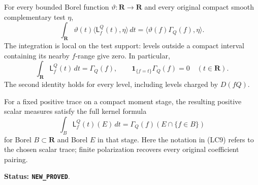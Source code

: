 \begin{theorem}
\label{thm:r11-level-coarea}
For every bounded Borel function $\vartheta:\mathbf R\to\mathbf R$
and every original compact smooth complementary test $\eta$,
\[
 \int_{\mathbf R}\vartheta(t)
                 \langle\mathsf L^Q_f(t),\eta\rangle\,dt
       =\langle\vartheta(f)\Gamma_Q(f),\eta\rangle.
 \tag{LC7}
\]
The integration is local on the test support: levels outside a
compact interval containing its nearby $f$-range give zero.
In particular,
\[
 \int_{\mathbf R}\mathsf L^Q_f(t)\,dt=\Gamma_Q(f),
 \qquad
 \mathbf1_{\{f=t\}}\Gamma_Q(f)=0\quad(t\in\mathbf R).
 \tag{LC8}
\]
The second identity holds for every level, including levels
charged by $D(fQ)$.

For a fixed positive trace on a compact moment stage, the resulting
positive scalar measures satisfy the full kernel formula
\[
 \int_B \mathsf L^Q_f(t)(E)\,dt
       =\Gamma_Q(f)(E\cap\{f\in B\})
 \tag{LC9}
\]
for Borel $B\subset\mathbf R$ and Borel $E$ in that stage.
Here the notation in (LC9) refers to the chosen scalar trace;
finite polarization recovers every original coefficient pairing.
\end{theorem}

\noindent\textbf{Status: \texttt{NEW\_PROVED}}.

